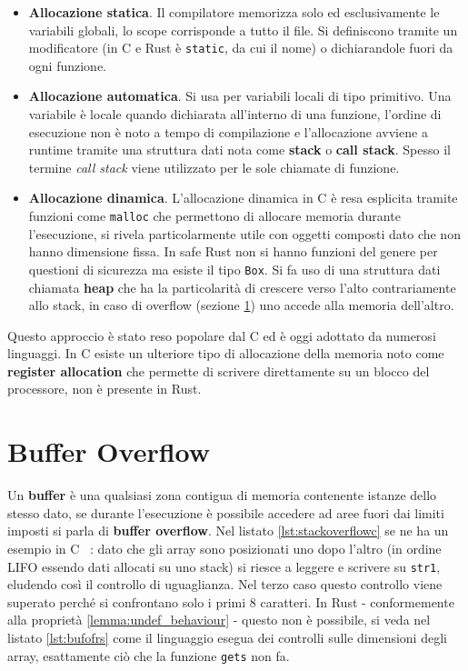 \documentclass[Lau,binding=0.6cm]{sapthesis}
\newcommand{\textcode}[1]{\colorbox{backcolour}{\texttt{#1}}}
\begin{document}
\begin{itemize}
	\item \textbf{Allocazione statica}. Il compilatore memorizza solo ed esclusivamente le variabili globali, lo scope corrisponde a tutto il file.
		Si definiscono tramite un modificatore (in C e Rust è \textcode{static}, da cui il nome) o dichiarandole fuori da ogni funzione.  
    	\item \textbf{Allocazione automatica}. Si usa per variabili locali di tipo primitivo. Una variabile è locale quando dichiarata all'interno di una funzione, l'ordine di esecuzione non è noto a tempo di compilazione e l'allocazione avviene a runtime tramite una struttura dati nota come \textbf{stack} o \textbf{call stack}. 
		Spesso il termine \textit{call stack} viene utilizzato per le sole chiamate di funzione. 
    	\item \textbf{Allocazione dinamica}. L'allocazione dinamica in C è resa esplicita tramite funzioni come \textcode{malloc} che permettono di allocare memoria durante l'esecuzione, si rivela particolarmente utile con oggetti composti dato che non hanno dimensione fissa. 
    		In safe Rust non si hanno funzioni del genere per questioni di sicurezza ma esiste il tipo \textcode{Box}.
		Si fa uso di una struttura dati chiamata \textbf{heap} che ha la particolarità di crescere verso l'alto contrariamente allo stack, in caso di overflow (sezione \ref{sec:buffer_overflow}) uno accede alla memoria dell'altro. 
\end{itemize}

Questo approccio è stato reso popolare dal C ed è oggi adottato da numerosi linguaggi.
In C esiste un ulteriore tipo di allocazione della memoria noto come \textbf{register allocation} che permette di scrivere direttamente su un blocco del processore, non è presente in Rust.

\section{Buffer Overflow} \label{sec:buffer_overflow}
Un \textbf{buffer} è una qualsiasi zona contigua di memoria contenente istanze dello stesso dato, se durante l'esecuzione è possibile accedere ad aree fuori dai limiti imposti si parla di \textbf{buffer overflow}.
Nel listato \ref{lst:stackoverflowc} se ne ha un esempio in C ~\cite[7.5]{stallings:os}: dato che gli array sono posizionati uno dopo l'altro (in ordine LIFO essendo dati allocati su uno stack) si riesce a leggere e scrivere su \textcode{str1}, eludendo così il controllo di uguaglianza.
Nel terzo caso questo controllo viene superato perché si confrontano solo i primi 8 caratteri.
In Rust - conformemente alla proprietà \ref{lemma:undef_behaviour} - questo non è possibile, si veda nel listato \ref{lst:bufofrs} come il linguaggio esegua dei controlli sulle dimensioni degli array, esattamente ciò che la funzione \textcode{gets} non fa. 
\end{document}
